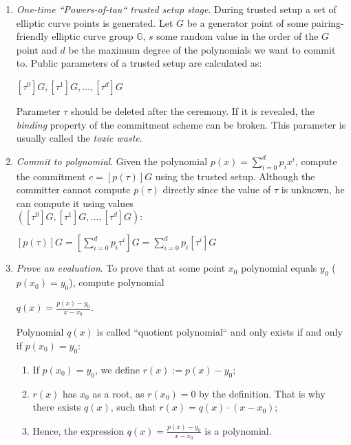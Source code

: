 \documentclass[../lecture-notes.tex]{subfiles}
\begin{document}
\begin{enumerate}[left=0mm]
    \item \textit{One-time ``Powers-of-tau`` trusted setup stage}. During trusted setup a set of elliptic curve points is generated. 
    Let $G$ be a generator point of some pairing-friendly
    elliptic curve group $\mathbb{G}$, $s$ some random value in the order of the $G$ point and $d$ be the maximum degree 
    of the polynomials we want to commit to.
    Public parameters of a trusted setup are calculated as:

    \begin{center}
        $[\tau^0]G, [\tau^1]G, \ldots, [\tau^d]G$
    \end{center}

    Parameter $\tau$ should be deleted after the ceremony. If it is revealed, the \textit{binding} property of the commitment scheme can be broken. 
    This parameter is usually called the \textit{toxic waste}.
    
    \item \textit{Commit to polynomial}. Given the polynomial $p(x) = \sum_{i = 0}^{d} p_i x^i$, compute the commitment $c = [p(\tau)]G $ 
    using the trusted setup. Although the committer cannot compute $p(\tau)$ directly since the value of $\tau$ is unknown, he can
    compute it using values \\ $([\tau^0]G, [\tau^1]G, \ldots, [\tau^d]G)$:
    
    \begin{center}
       $ [p(\tau)]G = [\sum_{i=0}^{d} p_i \tau^i]G = \sum_{i=0}^{d}p_i[\tau^i]G$
    \end{center}
    
    \item \textit{Prove an evaluation}. To prove that at some point $x_0$ polynomial equals $y_0$ ($p(x_0) = y_0$), compute polynomial
    
    \begin{center}
        $q(x) = \frac{p(x) - y_0}{x - x_0}$.
    \end{center}

    Polynomial $q(x)$ is called ``quotient polynomial`` and only exists if and only if $p(x_0) = y_0$:
    \begin{enumerate}
        \item If $p(x_0) = y_0$, we define $r(x) := p(x) - y_0$;
        \item $r(x)$ has $x_0$ as a root, as $r(x_0) = 0$ by the definition. 
            That is why there exists $q(x)$, such that $r(x) = q(x)\cdot (x-x_0)$;
        \item Hence, the expression $q(x) = \frac{p(x) - y_0}{x-x_0}$ is a polynomial.
    \end{enumerate}
    

\end{enumerate}
\end{document}
